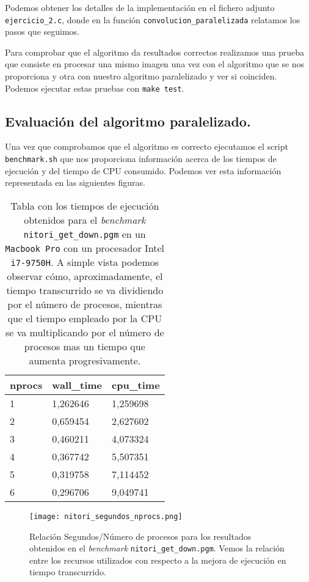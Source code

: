Podemos obtener los detalles de la implementación en el fichero adjunto \texttt{ejercicio\_2.c}, donde en
la función \texttt{convolucion\_paralelizada} relatamos los pasos que seguimos.

Para comprobar que el algoritmo da resultados correctos realizamos una prueba que consiste en procesar una mismo imagen una vez con el algoritmo
que se nos proporciona y otra con nuestro algoritmo paralelizado y ver si coinciden. Podemos ejecutar estas pruebas con \texttt{make test}.

\subsection{Evaluación del algoritmo paralelizado.}

Una vez que comprobamos que el algoritmo es correcto ejecutamos el script \texttt{benchmark.sh} que nos proporciona
información acerca de los tiempos de ejecución y del tiempo de CPU consumido. Podemos ver esta información representada
en las siguientes figuras.

\begin{table}[!ht]
    \centering
    \begin{tabular}{|l|l|l|}
    \hline
        \textbf{nprocs} & \textbf{wall\_time} & \textbf{cpu\_time} \\ \hline
        1 & 1,262646 & 1,259698 \\ \hline
        2 & 0,659454 & 2,627602 \\ \hline
        3 & 0,460211 & 4,073324 \\ \hline
        4 & 0,367742 & 5,507351 \\ \hline
        5 & 0,319758 & 7,114452 \\ \hline
        6 & 0,296706 & 9,049741 \\ \hline
    \end{tabular}
    \caption{Tabla con los tiempos de ejecución obtenidos para el \textit{benchmark} \texttt{nitori\_get\_down.pgm} en un \texttt{Macbook Pro}
    con un procesador Intel \texttt{i7-9750H}. A simple vista podemos observar cómo, aproximadamente, el tiempo
    transcurrido se va dividiendo por el número de procesos, mientras que el tiempo empleado por la CPU se va
    multiplicando por el número de procesos mas un tiempo que aumenta progresivamente.}
\end{table}


\begin{figure}[H]
    \centering
    \texttt{[image: nitori\_segundos\_nprocs.png]}
    \caption{Relación Segundos/Número de procesos para los resultados obtenidos en el \textit{benchmark} \texttt{nitori\_get\_down.pgm}.
    Vemos la relación entre los recursos utilizados con respecto a la mejora de ejecución en tiempo transcurrido.}
\end{figure}

